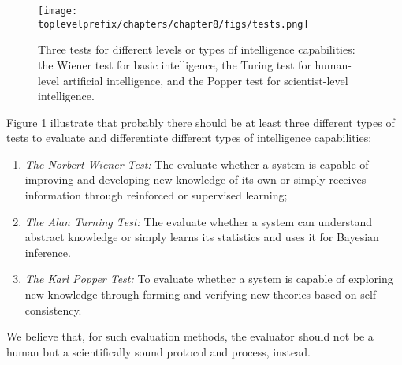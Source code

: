 \documentclass[../../book-main.tex]{subfiles}
\begin{document}
\begin{figure}[t]
    \centering
    \texttt{[image: \\toplevelprefix/chapters/chapter8/figs/tests.png]}
    \caption{Three tests for different levels or types of intelligence capabilities: the Wiener test for basic intelligence, the Turing test for human-level artificial intelligence, and the Popper test for scientist-level intelligence.}
    \label{fig:three-tests}
\end{figure}

Figure \ref{fig:three-tests} illustrate that probably there should be at least three different types of tests to evaluate and differentiate different types of intelligence capabilities:
\begin{enumerate}
    \item {\em The Norbert Wiener Test:} The evaluate whether a system is capable of improving and developing new knowledge of its own or simply receives information through reinforced or supervised learning;
    \item {\em The Alan Turning Test:} The evaluate whether a system can understand abstract knowledge or simply learns its statistics and uses it for Bayesian inference.
    \item {\em The Karl Popper Test:} To evaluate whether a system is capable of exploring new knowledge through forming and verifying new theories based on self-consistency.
\end{enumerate}
We believe that, for such evaluation methods, the evaluator should not be a human but a scientifically sound protocol and process, instead.
\end{document}
